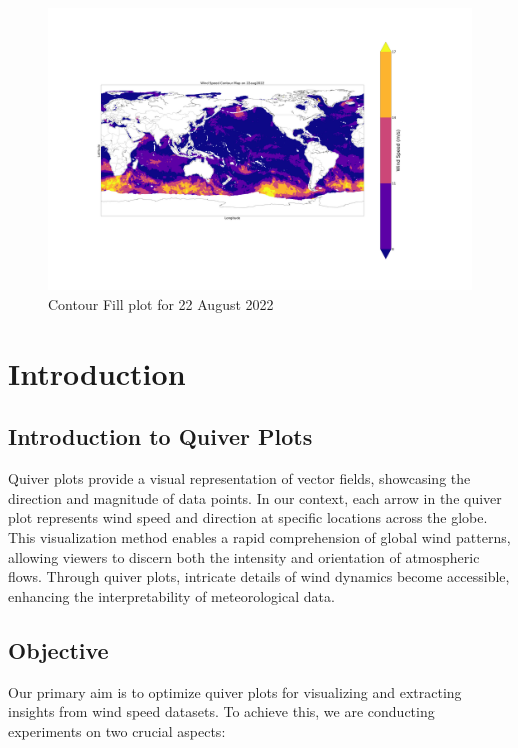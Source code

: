 \documentclass[conference]{IEEEtran}
\begin{document}
\begin{figure}
    \centering
    \includegraphics[scale=0.05]{images_deep/contour_plasma_fill.png}
    \caption{Contour Fill plot for 22 August 2022}
    \label{contour_fill}
\end{figure}


\section{Introduction}


\subsection{Introduction to Quiver Plots}

Quiver plots provide a visual representation of vector fields, showcasing the direction and magnitude of data points. In our context, each arrow in the quiver plot represents wind speed and direction at specific locations across the globe. This visualization method enables a rapid comprehension of global wind patterns, allowing viewers to discern both the intensity and orientation of atmospheric flows. Through quiver plots, intricate details of wind dynamics become accessible, enhancing the interpretability of meteorological data.
 

\subsection{Objective}

Our primary aim is to optimize quiver plots for visualizing and extracting insights from wind speed datasets. To achieve this, we are conducting experiments on two crucial aspects:
\end{document}
